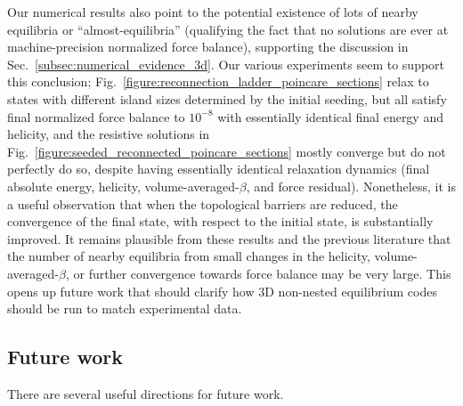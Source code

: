 \documentclass[%
 reprint,
 superscriptaddress,
 amsmath,amssymb,
 aps, nofootinbib, floatfix]{revtex4-2}
\begin{document}
Our numerical results also point to the potential existence of lots of nearby equilibria or ``almost-equilibria'' (qualifying the fact that no solutions are ever at machine-precision normalized force balance), supporting the discussion in Sec.~\ref{subsec:numerical_evidence_3d}. Our various experiments seem to support this conclusion; Fig.~\ref{figure:reconnection_ladder_poincare_sections} relax to states with different island sizes determined by the initial seeding, but all satisfy final normalized force balance to $10^{-8}$ with essentially identical final energy and helicity, and the resistive solutions in Fig.~\ref{figure:seeded_reconnected_poincare_sections} mostly converge but do not perfectly do so, despite having essentially identical relaxation dynamics (final absolute energy, helicity, volume-averaged-$\beta$, and force residual). Nonetheless, it is a useful observation that when the topological barriers are reduced, the convergence of the final state, with respect to the initial state, is substantially improved. It remains plausible from these results and the previous literature that the number of nearby equilibria from small changes in the helicity, volume-averaged-$\beta$, or further convergence towards force balance may be very large. This opens up future work that should clarify how 3D non-nested equilibrium codes should be run to match experimental data. 

\subsection{Future work}
\label{sec:future_work}
There are several useful directions for future work. 
\end{document}
